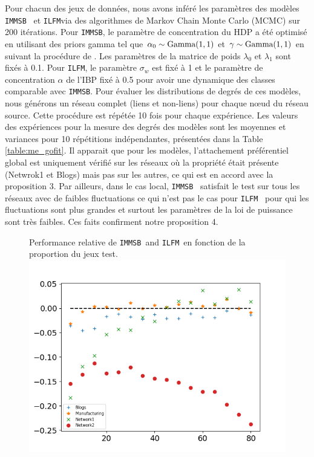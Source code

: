 \documentclass[french]{hermes-journal}
\renewcommand{\text}{\textnormal}
\newcommand{\ilfm}{\texttt{ILFM}}
\newcommand{\immsb}{\texttt{IMMSB}}
\begin{document}
Pour chacun des jeux de données, nous avons inféré les paramètres des modèles \immsb~ et \ilfm  via des algorithmes de Markov Chain Monte Carlo (MCMC) sur 200 itérations. Pour \immsb, le paramètre de concentration du HDP a été optimisé en utilisant des priors gamma tel que $\alpha_0 \sim \text{Gamma}(1,1)$ et $\gamma \sim \text{Gamma}(1,1)$ en suivant la procédure de \cite{HDP}. Les paramètres de la matrice de poids $\lambda_0$ et $\lambda_1$ sont fixés à 0.1. Pour \ilfm, le paramètre $\sigma_w$ est fixé à 1 et le paramètre de concentration $\alpha$ de l'IBP fixé à 0.5 pour avoir une dynamique des classes comparable avec \immsb. Pour évaluer les distributions de degrés de ces modèles, nous générons un réseau complet (liens et non-liens) pour chaque n\oe{}ud du réseau source. Cette procédure est répétée 10 fois pour chaque expérience. Les valeurs des expériences pour la mesure des degrés des modèles  sont les moyennes et variances pour 10 répétitions indépendantes, présentées dans la Table \ref{table:me_gofit}. 
Il apparait que pour les modèles, l'attachement préférentiel global est uniquement vérifié sur les réseaux où la propriété était présente (Netwrok1 et Blogs) mais pas sur les autres, ce qui est en accord avec la proposition 3. Par ailleurs, dans le cas local, \immsb~ satisfait le test sur tous les réseaux avec de faibles fluctuations ce qui n'est pas le cas pour \ilfm~ pour qui les fluctuations sont plus grandes et surtout les paramètres de la loi de puissance sont très faibles. Ces faits confirment notre proposition 4.





\begin{figure}[h] {Performance relative de \immsb\ and \ilfm\ en fonction de la proportion du jeux test.} 
        \includegraphics[scale=0.45]{img/corpus/testset_max_20.png}
\label{fig:auc}
\end{figure}
\end{document}
